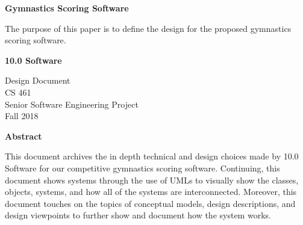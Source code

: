 \documentclass[letterpaper,10pt,draftclsnofoot,onecolumn,]{article}
\begin{document}
\noindent
\begin{titlepage}
    \begin{center}
        \vspace*{1cm}
        
        \textbf{\huge{Gymnastics Scoring Software}}
        
        \vspace{0.5cm}
        \large{The purpose of this paper is to define the design for the proposed gymnastics scoring software.}
        
        \vspace{1.5cm}
        
        \textbf{\LARGE{10.0 Software}}
        
        \Large{Design Document\\
        CS 461\\
        Senior Software Engineering Project\\
        Fall 2018}
        \vspace*{\fill}
        \begin{center}
            \textbf{\large{Abstract}}
        \end{center}
        \normalsize{This document archives the in depth technical and design choices made by 10.0 Software for our competitive gymnastics scoring software. Continuing, this document shows systems through the use of UMLs to visually show the classes, objects, systems, and how all of the systems are interconnected. Moreover, this document touches on the topics of conceptual models, design descriptions, and design viewpoints to further show and document how the system works.}
    \end{center}
\end{titlepage}

\tableofcontents
\newpage
\end{document}
